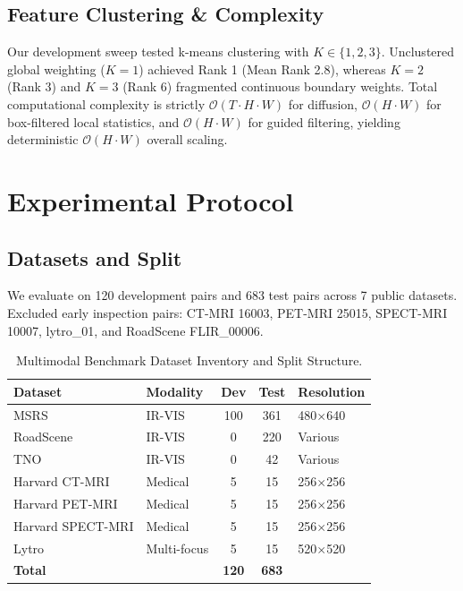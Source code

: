 \documentclass[conference]{IEEEtran}
\begin{document}
\subsection{Feature Clustering \& Complexity}
Our development sweep tested k-means clustering with $K \in \{1, 2, 3\}$. Unclustered global weighting ($K=1$) achieved Rank 1 (Mean Rank 2.8), whereas $K=2$ (Rank 3) and $K=3$ (Rank 6) fragmented continuous boundary weights. Total computational complexity is strictly $\mathcal{O}(T \cdot H \cdot W)$ for diffusion, $\mathcal{O}(H \cdot W)$ for box-filtered local statistics, and $\mathcal{O}(H \cdot W)$ for guided filtering, yielding deterministic $\mathcal{O}(H \cdot W)$ overall scaling.

\section{Experimental Protocol}
\subsection{Datasets and Split}
We evaluate on 120 development pairs and 683 test pairs across 7 public datasets. Excluded early inspection pairs: CT-MRI 16003, PET-MRI 25015, SPECT-MRI 10007, lytro\_01, and RoadScene FLIR\_00006.

\begin{table}[htbp]
\caption{Multimodal Benchmark Dataset Inventory and Split Structure.}
\begin{center}
\begin{tabular}{llccl}
\toprule
\textbf{Dataset} & \textbf{Modality} & \textbf{Dev} & \textbf{Test} & \textbf{Resolution} \\
\midrule
MSRS & IR-VIS & 100 & 361 & 480$\times$640 \\
RoadScene & IR-VIS & 0 & 220 & Various \\
TNO & IR-VIS & 0 & 42 & Various \\
Harvard CT-MRI & Medical & 5 & 15 & 256$\times$256 \\
Harvard PET-MRI & Medical & 5 & 15 & 256$\times$256 \\
Harvard SPECT-MRI & Medical & 5 & 15 & 256$\times$256 \\
Lytro & Multi-focus & 5 & 15 & 520$\times$520 \\
\midrule
\textbf{Total} & & \textbf{120} & \textbf{683} & \\
\bottomrule
\end{tabular}
\end{center}
\end{table}
\end{document}

